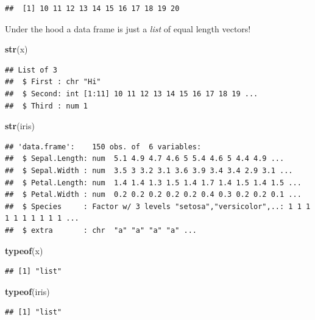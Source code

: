 \documentclass[
]{book}
\newenvironment{Shaded}{\begin{snugshade}}{\end{snugshade}}
\newcommand{\KeywordTok}[1]{\textcolor[rgb]{0.13,0.29,0.53}{\textbf{#1}}}
\newcommand{\NormalTok}[1]{#1}
\theoremstyle{definition}
\theoremstyle{definition}
\theoremstyle{definition}
\theoremstyle{remark}
\begin{document}
\begin{verbatim}
##  [1] 10 11 12 13 14 15 16 17 18 19 20
\end{verbatim}

Under the hood a data frame is just a \emph{list} of equal length vectors!

\begin{Shaded}
\begin{Highlighting}[]
\KeywordTok{str}\NormalTok{(x)}
\end{Highlighting}
\end{Shaded}

\begin{verbatim}
## List of 3
##  $ First : chr "Hi"
##  $ Second: int [1:11] 10 11 12 13 14 15 16 17 18 19 ...
##  $ Third : num 1
\end{verbatim}

\begin{Shaded}
\begin{Highlighting}[]
\KeywordTok{str}\NormalTok{(iris)}
\end{Highlighting}
\end{Shaded}

\begin{verbatim}
## 'data.frame':    150 obs. of  6 variables:
##  $ Sepal.Length: num  5.1 4.9 4.7 4.6 5 5.4 4.6 5 4.4 4.9 ...
##  $ Sepal.Width : num  3.5 3 3.2 3.1 3.6 3.9 3.4 3.4 2.9 3.1 ...
##  $ Petal.Length: num  1.4 1.4 1.3 1.5 1.4 1.7 1.4 1.5 1.4 1.5 ...
##  $ Petal.Width : num  0.2 0.2 0.2 0.2 0.2 0.4 0.3 0.2 0.2 0.1 ...
##  $ Species     : Factor w/ 3 levels "setosa","versicolor",..: 1 1 1 1 1 1 1 1 1 1 ...
##  $ extra       : chr  "a" "a" "a" "a" ...
\end{verbatim}

\begin{Shaded}
\begin{Highlighting}[]
\KeywordTok{typeof}\NormalTok{(x)}
\end{Highlighting}
\end{Shaded}

\begin{verbatim}
## [1] "list"
\end{verbatim}

\begin{Shaded}
\begin{Highlighting}[]
\KeywordTok{typeof}\NormalTok{(iris)}
\end{Highlighting}
\end{Shaded}

\begin{verbatim}
## [1] "list"
\end{verbatim}
\end{document}
